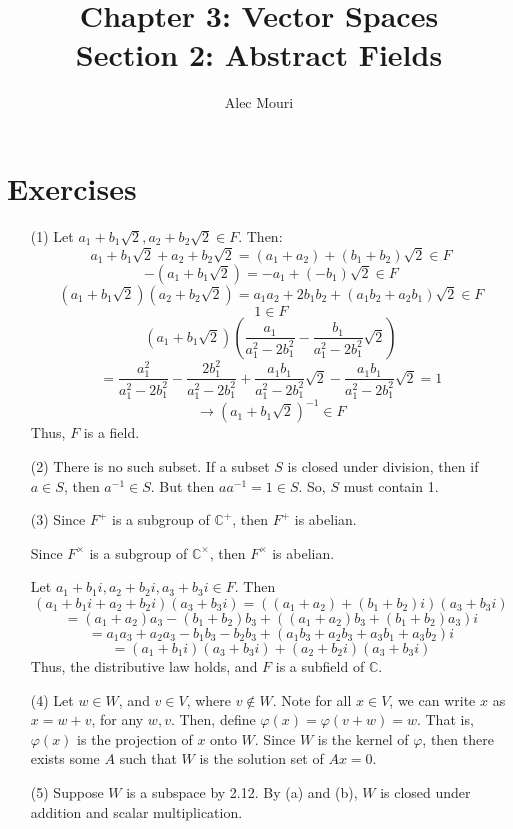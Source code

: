 \documentclass[12pt]{article}
\begin{document}
\title{Chapter 3: Vector Spaces \\ Section 2: Abstract Fields}
\author{Alec Mouri}

\maketitle
\section*{Exercises}
\begin{itemize}
\item[(1)]
Let $a_1 + b_1\sqrt{2}, a_2 + b_2\sqrt{2} \in F$. Then:
$$a_1 + b_1\sqrt{2} + a_2 + b_2\sqrt{2} = (a_1 + a_2) + (b_1 + b_2)\sqrt{2} \in F$$
$$-(a_1 + b_1\sqrt{2}) = -a_1 + (-b_1)\sqrt{2} \in F$$
$$(a_1 + b_1\sqrt{2})(a_2 + b_2\sqrt{2}) = a_1a_2 + 2b_1b_2 + (a_1b_2 + a_2b_1)\sqrt{2} \in F$$
$$1 \in F$$
$$\left(a_1 + b_1\sqrt{2}\right)\left(\frac{a_1}{a_1^2 - 2b_1^2} - \frac{b_1}{a_1^2 - 2b_1^2}\sqrt{2}\right)$$
$$=\frac{a_1^2}{a_1^2 - 2b_1^2} - \frac{2b_1^2}{a_1^2 - 2b_1^2} + \frac{a_1b_1}{a_1^2 - 2b_1^2}\sqrt{2} - \frac{a_1b_1}{a_1^2 - 2b_1^2}\sqrt{2} = 1$$
$$\rightarrow (a_1 + b_1\sqrt{2})^{-1} \in F$$
Thus, $F$ is a field.
\item[(2)]
There is no such subset. If a subset $S$ is closed under division, then if $a \in S$, then $a^{-1} \in S$. But then $aa^{-1} = 1 \in S$. So, $S$ must contain 1.
\item[(3)]
Since $F^+$ is a subgroup of $\mathbb{C}^+$, then $F^+$ is abelian.

Since $F^\times$ is a subgroup of $\mathbb{C}^\times$, then $F^\times$ is abelian.

Let $a_1 + b_1i, a_2 + b_2i, a_3 + b_3i \in F$. Then
$$(a_1 + b_1i + a_2 + b_2i)(a_3 + b_3i) = ((a_1 + a_2) + (b_1 + b_2)i)(a_3 + b_3i)$$
$$= (a_1+ a_2)a_3 - (b_1 + b_2)b_3 + ((a_1 +a_2)b_3 + (b_1 + b_2)a_3)i$$
$$= a_1a_3 + a_2a_3 - b_1b_3 - b_2b_3 + (a_1b_3 + a_2b_3 + a_3b_1 + a_3b_2)i$$
$$= (a_1 + b_1i)(a_3 + b_3i) + (a_2 + b_2i)(a_3 + b_3i)$$
Thus, the distributive law holds, and $F$ is a subfield of $\mathbb{C}$.
\item[(4)]
Let $w \in W$, and $v \in V$, where $v \not \in W$. Note for all $x \in V$, we can write $x$ as $x = w + v$, for any $w, v$. Then, define $\varphi(x) = \varphi(v + w) = w$. That is, $\varphi(x)$ is the projection of $x$ onto $W$. Since $W$ is the kernel of $\varphi$, then there exists some $A$ such that $W$ is the solution set of $Ax = 0$.
\item[(5)]
Suppose $W$ is a subspace by 2.12. By (a) and (b), $W$ is closed under addition and scalar multiplication.


\end{itemize}
\end{document}
